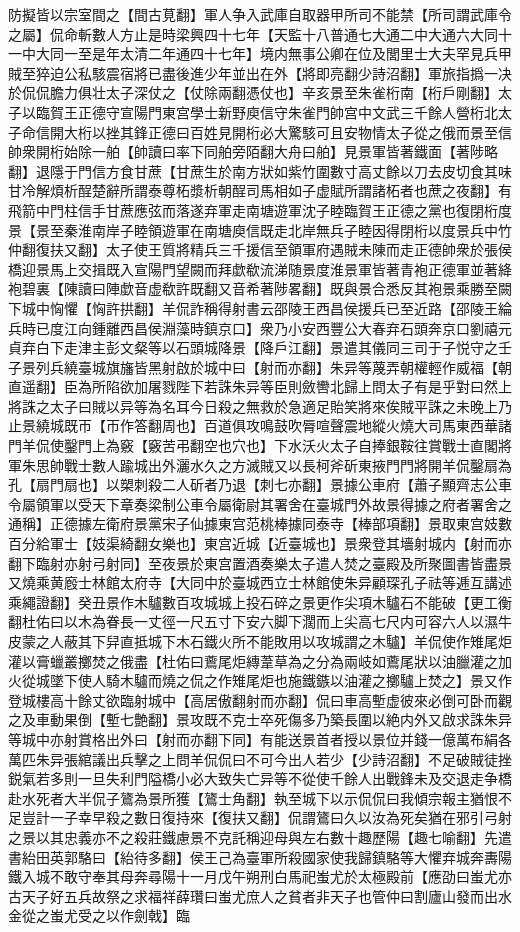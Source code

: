 防擬皆以宗室間之【間古莧翻】軍人争入武庫自取器甲所司不能禁【所司謂武庫令之屬】侃命斬數人方止是時梁興四十七年【天監十八普通七大通二中大通六大同十一中大同一至是年太清二年通四十七年】境内無事公卿在位及閭里士大夫罕見兵甲賊至猝迫公私駭震宿將已盡後進少年並出在外【將即亮翻少詩沼翻】軍旅指撝一决於侃侃膽力俱壮太子深仗之【仗除兩翻憑仗也】辛亥景至朱雀桁南【桁戶剛翻】太子以臨賀王正德守宣陽門東宫學士新野庾信守朱雀門帥宫中文武三千餘人營桁北太子命信開大桁以挫其鋒正德曰百姓見開桁必大驚駭可且安物情太子從之俄而景至信帥衆開桁始除一舶【帥讀曰率下同舶旁陌翻大舟曰舶】見景軍皆著鐵面【著陟略翻】退隱于門信方食甘蔗【甘蔗生於南方狀如紫竹圍數寸高丈餘以刀去皮切食其味甘冷解煩析酲楚辭所謂泰尊柘漿析朝酲司馬相如子虚賦所謂諸柘者也蔗之夜翻】有飛箭中門柱信手甘蔗應弦而落遂弃軍走南塘遊軍沈子睦臨賀王正德之黨也復閉桁度景【景至秦淮南岸子睦領遊軍在南塘庾信既走北岸無兵子睦因得閉桁以度景兵中竹仲翻復扶又翻】太子使王質將精兵三千援信至領軍府遇賊未陳而走正德帥衆於張侯橋迎景馬上交揖既入宣陽門望闕而拜歔欷流涕随景度淮景軍皆著青袍正德軍並著絳袍碧裏【陳讀曰陣歔音虚欷許既翻又音希著陟畧翻】既與景合悉反其袍景乘勝至闕下城中恟懼【恟許拱翻】羊侃詐稱得射書云邵陵王西昌侯援兵已至近路【邵陵王綸兵時已度江向鍾離西昌侯淵藻時鎮京口】衆乃小安西豐公大春弃石頭奔京口劉禧元貞弃白下走津主彭文粲等以石頭城降景【降戶江翻】景遣其儀同三司于子悦守之壬子景列兵繞臺城旗旛皆黑射啟於城中曰【射而亦翻】朱异等蔑弄朝權輕作威福【朝直遥翻】臣為所陷欲加屠戮陛下若誅朱异等臣則斂轡北歸上問太子有是乎對曰然上將誅之太子曰賊以异等為名耳今日殺之無救於急適足貽笑將來俟賊平誅之未晚上乃止景繞城既帀【帀作答翻周也】百道俱攻鳴鼓吹脣喧聲震地縱火燒大司馬東西華諸門羊侃使鑿門上為竅【竅苦弔翻空也穴也】下水沃火太子自捧銀鞍往賞戰士直閣將軍朱思帥戰士數人踰城出外灑水久之方滅賊又以長柯斧斫東掖門門將開羊侃鑿扇為孔【扇門扇也】以槊刺殺二人斫者乃退【刺七亦翻】景據公車府【蕭子顯齊志公車令屬領軍以受天下章奏梁制公車令屬衛尉其署舍在臺城門外故景得據之府者署舍之通稱】正德據左衛府景黨宋子仙據東宫范桃棒據同泰寺【棒部項翻】景取東宫妓數百分給軍士【妓渠綺翻女樂也】東宫近城【近臺城也】景衆登其墻射城内【射而亦翻下臨射亦射弓射同】至夜景於東宫置酒奏樂太子遣人焚之臺殿及所聚圖書皆盡景又燒乘黄廏士林館太府寺【大同中於臺城西立士林館使朱异顧琛孔子祛等逓互講述乘繩證翻】癸丑景作木驢數百攻城城上投石碎之景更作尖項木驢石不能破【更工衡翻杜佑曰以木為眷長一丈徑一尺五寸下安六脚下濶而上尖高七尺内可容六人以濕牛皮蒙之人蔽其下舁直抵城下木石鐵火所不能敗用以攻城謂之木驢】羊侃使作雉尾炬灌以膏蠟叢擲焚之俄盡【杜佑曰鷰尾炬縳葦草為之分為兩岐如鷰尾狀以油臘灌之加火從城墜下使人騎木驢而燒之侃之作雉尾炬也施鐵鏃以油灌之擲驢上焚之】景又作登城樓高十餘丈欲臨射城中【高居傲翻射而亦翻】侃曰車高塹虚彼來必倒可卧而觀之及車動果倒【塹七艶翻】景攻既不克士卒死傷多乃築長圍以絶内外又啟求誅朱异等城中亦射賞格出外曰【射而亦翻下同】有能送景首者授以景位并錢一億萬布絹各萬匹朱异張綰議出兵擊之上問羊侃侃曰不可今出人若少【少詩沼翻】不足破賊徒挫鋭氣若多則一旦失利門隘橋小必大致失亡异等不從使千餘人出戰鋒未及交退走争橋赴水死者大半侃子鷟為景所獲【鷟士角翻】執至城下以示侃侃曰我傾宗報主猶恨不足豈計一子幸早殺之數日復持來【復扶又翻】侃謂鷟曰久以汝為死矣猶在邪引弓射之景以其忠義亦不之殺莊鐵慮景不克託稱迎母與左右數十趣歷陽【趣七喻翻】先遣書紿田英郭駱曰【紿待多翻】侯王己為臺軍所殺國家使我歸鎮駱等大懼弃城奔夀陽鐵入城不敢守奉其母奔尋陽十一月戊午朔刑白馬祀蚩尤於太極殿前【應劭曰蚩尤亦古天子好五兵故祭之求福祥薛瓚曰蚩尤庶人之貧者非天子也管仲曰割廬山發而出水金從之蚩尤受之以作劍戟】臨